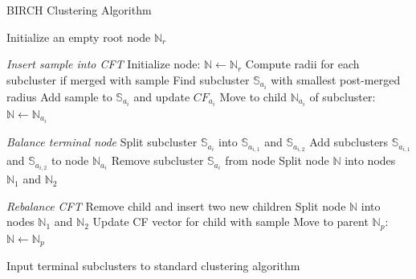 \begin{algorithm}[h!]
\caption[BIRCH Clustering Algorithm]{BIRCH Clustering Algorithm}
\label{alg:chap10-birch}
\begin{algorithmic}[1]
  \State Initialize an empty root node $\mathbb{N}_{r}$
  
    \item[]
  
    \Statex \hspace{0.2in} \textit{Insert sample into CFT}
    \State Initialize  node: $\mathbb{N} \leftarrow \mathbb{N}_{r}$
      \State Compute radii for each subcluster if merged with sample 
      \State Find subcluster $\mathbb{S}_{a_{i}}$ with smallest post-merged radius
        \State Add sample to $\mathbb{S}_{a_{i}}$ and update $CF_{a_{i}}$ 
  	  \Else
  	    \State Move to child $\mathbb{N}_{a_{i}}$ of subcluster: $\mathbb{N} \leftarrow \mathbb{N}_{a_{i}}$
  	  \EndIf
    \EndFor

    \item[]

    \Statex \hspace{0.2in} \textit{Balance terminal node}
     
      \State Split subcluster $\mathbb{S}_{a_{i}}$ into $\mathbb{S}_{a_{i,1}}$ and $\mathbb{S}_{a_{i,2}}$
      \State Add subclusters $\mathbb{S}_{a_{i,1}}$ and $\mathbb{S}_{a_{i,2}}$ to node $\mathbb{N}_{a_{i}}$
      \State Remove subcluster $\mathbb{S}_{a_{i}}$ from node
        \State Split node $\mathbb{N}$ into nodes $\mathbb{N}_{1}$ and $\mathbb{N}_{2}$
      \EndIf
    \EndIf
    
    \item[]

    \Statex \hspace{0.2in} \textit{Rebalance CFT}
        \State Remove child and insert two new children
          \State Split node $\mathbb{N}$ into nodes $\mathbb{N}_{1}$ and $\mathbb{N}_{2}$
        \EndIf
      \Else
        \State Update CF vector for child with sample         
      \EndIf
	  \State Move to parent $\mathbb{N}_{p}$: $\mathbb{N} \leftarrow \mathbb{N}_{p}$
    \EndFor

  \item[]

  \EndFor

  \item[]

  \State Input terminal subclusters to standard clustering algorithm 
\end{algorithmic}
\end{algorithm}

